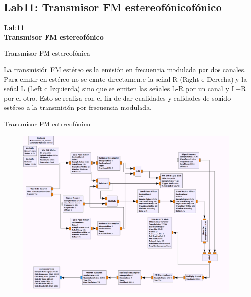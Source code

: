 \subsection{Lab11: Transmisor FM estereofónicofónico}

\begin{frame}{}


\bfseries{\textrm{\LARGE Lab11\\ \Large Transmisor FM estereofónico}}
\raggedright
\end{frame}


\begin{frame}{Transmisor FM estereofónica}


La transmisión FM estéreo es la emisión en frecuencia modulada por dos canales. Para emitir en estéreo no se emite directamente la señal R (Right o Derecha) y la señal L (Left o Izquierda) sino que se emiten las señales L-R por un canal y L+R por el otro. Esto se realiza con el fin de dar cualidades y calidades de sonido estéreo a la transmisión por frecuencia modulada.

\end{frame}

\begin{frame}{Transmisor FM estereofónico}
    
\begin{figure}[H]
\centering
\vspace{-3mm}
\includegraphics[width=.8\textwidth]{parte3/lab12/pdf/lab12_1.pdf}
\end{figure}
    
\end{frame}


